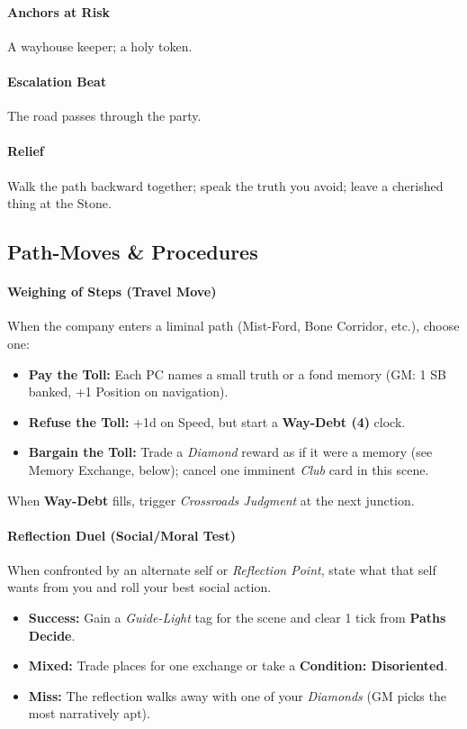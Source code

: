 \paragraph{Anchors at Risk} A wayhouse keeper; a holy token.
\paragraph{Escalation Beat} The road passes through the party.
\paragraph{Relief} Walk the path backward together; speak the truth you avoid; leave a cherished thing at the Stone.
\subsection*{Path-Moves \& Procedures}

\paragraph{Weighing of Steps (Travel Move)}
When the company enters a liminal path (Mist-Ford, Bone Corridor, etc.), choose one:
\begin{itemize}
  \item \textbf{Pay the Toll:} Each PC names a small truth or a fond memory (GM: 1 SB banked, +1 Position on navigation).
  \item \textbf{Refuse the Toll:} +1d on Speed, but start a \textbf{Way-Debt (4)} clock.
  \item \textbf{Bargain the Toll:} Trade a \emph{Diamond} reward as if it were a memory (see Memory Exchange, below); cancel one imminent \emph{Club} card in this scene.
\end{itemize}
When \textbf{Way-Debt} fills, trigger \emph{Crossroads Judgment} at the next junction.

\paragraph{Reflection Duel (Social/Moral Test)}
When confronted by an alternate self or \emph{Reflection Point}, state what that self wants from you and roll your best social action.
\begin{itemize}
  \item \textbf{Success:} Gain a \emph{Guide-Light} tag for the scene and clear 1 tick from \textbf{Paths Decide}.
  \item \textbf{Mixed:} Trade places for one exchange or take a \textbf{Condition: Disoriented}.
  \item \textbf{Miss:} The reflection walks away with one of your \emph{Diamonds} (GM picks the most narratively apt).
\end{itemize}


